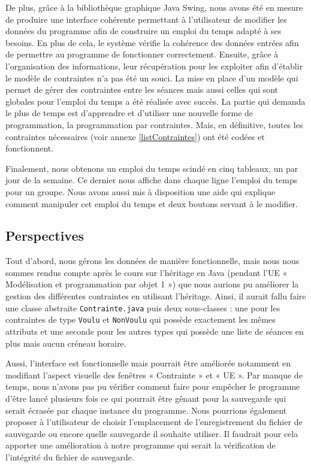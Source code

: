 \documentclass[12pt,a4paper]{article}
\begin{document}
De plus, grâce à la bibliothèque graphique Java Swing, nous avons été en mesure de produire une interface cohérente permettant à l’utilisateur de modifier les données du programme afin de construire un emploi du temps adapté à ses besoins. En plus de cela, le système vérifie la cohérence des données entrées afin de permettre au programme de fonctionner correctement. 
Ensuite, grâce à l'organisation des informations, leur récupération pour les exploiter afin d'établir le modèle de contraintes n'a pas été un souci. La mise en place d'un modèle qui permet de gérer des contraintes entre les séances mais aussi celles qui sont globales pour l'emploi du temps a été réalisée avec succès. La partie qui demanda le plus de temps est d'apprendre et d'utiliser une nouvelle forme de programmation, la programmation par contraintes. Mais, en définitive, toutes les contraintes nécessaires (voir annexe \autoref{listContraintes}) ont été codées et fonctionnent.

Finalement, nous obtenons un emploi du temps scindé en cinq tableaux, un par jour de la semaine. Ce dernier nous affiche dans chaque ligne l'emploi du temps pour un groupe. Nous avons aussi mis à disposition une aide qui explique comment manipuler cet emploi du temps et deux boutons servant à le modifier.

\subsection{Perspectives}

Tout d'abord, nous gérons les données de manière fonctionnelle, mais nous nous sommes rendus compte après le cours sur l'héritage en Java (pendant l'UE « Modélisation et programmation par objet 1 ») que nous aurions pu améliorer la gestion des différentes contraintes en utilisant l'héritage. Ainsi, il aurait fallu faire une classe abstraite \texttt{Contrainte.java} puis deux sous-classes : une pour les contraintes de type \texttt{Voulu} et \texttt{NonVoulu} qui possède exactement les mêmes attributs et une seconde pour les autres types qui possède une liste de séances en plus mais aucun créneau horaire.

Aussi, l'interface est fonctionnelle mais pourrait être améliorée notamment en modifiant l’aspect visuelle des fenêtres « Contrainte » et  « UE ». Par manque de temps, nous n’avons pas pu vérifier comment faire pour empêcher le programme d’être lancé plusieurs fois ce qui pourrait être gênant pour la sauvegarde qui serait écrasée par chaque instance du programme. Nous pourrions également proposer à l’utilisateur de choisir l’emplacement de l’enregistrement du fichier de sauvegarde ou encore quelle sauvegarde il souhaite utiliser. Il faudrait pour cela apporter une amélioration à notre programme qui serait la vérification de l’intégrité du fichier de sauvegarde.
\end{document}
